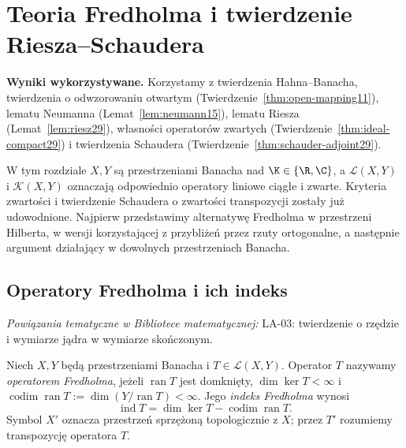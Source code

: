 \setcounter{section}{29}
\section{Teoria Fredholma i twierdzenie Riesza--Schaudera}
\label{sec:fredholm30}

\providecommand{\atlasref}[2]{#2}

\noindent\textbf{Wyniki wykorzystywane.}
Korzystamy z twierdzenia Hahna--Banacha, twierdzenia
o odwzorowaniu otwartym (Twierdzenie~\ref{thm:open-mapping11}),
lematu Neumanna (Lemat~\ref{lem:neumann15}), lematu Riesza
(Lemat~\ref{lem:riesz29}), własności operatorów zwartych
(Twierdzenie~\ref{thm:ideal-compact29}) i twierdzenia Schaudera
(Twierdzenie~\ref{thm:schauder-adjoint29}).
\par\medskip

W tym rozdziale $X,Y$ są przestrzeniami Banacha nad
$\K\in\{\R,\C\}$, a $\mathcal L(X,Y)$ i $\mathcal K(X,Y)$
oznaczają odpowiednio operatory liniowe ciągłe i zwarte.
Kryteria zwartości i twierdzenie Schaudera o zwartości transpozycji
zostały już udowodnione. Najpierw przedstawimy alternatywę
Fredholma w przestrzeni Hilberta, w wersji korzystającej z
przybliżeń przez rzuty ortogonalne, a następnie argument
działający w dowolnych przestrzeniach Banacha.

\subsection{Operatory Fredholma i ich indeks}

\noindent\emph{Powiązania tematyczne w Bibliotece matematycznej:} \atlasref{LA-03::thm:lin3-rzad-nullity}{LA-03: twierdzenie o rzędzie i wymiarze jądra w wymiarze skończonym}.


\begin{definicja}
\label{def:fredholm30}
Niech $X,Y$ będą przestrzeniami Banacha i $T\in\mathcal L(X,Y)$.
Operator $T$ nazywamy \emph{operatorem Fredholma}, jeżeli
$\operatorname{ran}T$ jest domknięty, $\dim\ker T<\infty$ i
$\operatorname{codim}\operatorname{ran}T:=\dim(Y/\operatorname{ran}T)<\infty$.
Jego \emph{indeks Fredholma} wynosi
\[\operatorname{ind}T=\dim\ker T-\operatorname{codim}\operatorname{ran}T.\]
Symbol $X'$ oznacza przestrzeń sprzężoną topologicznie z $X$; przez $T'$ rozumiemy transpozycję operatora $T$.
\end{definicja}

